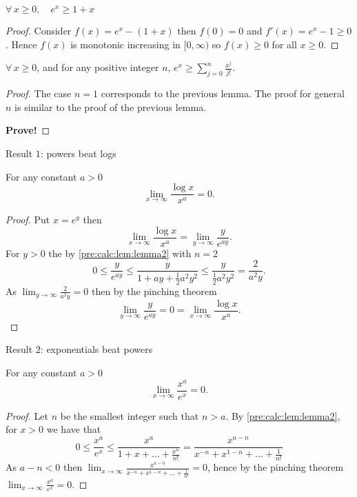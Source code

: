\documentclass[10pt, a4paper]{article}
\begin{document}
\begin{lemma}\label{pre:calc:lem:lemma1}
    $\forall\, x \geq 0,\quad e ^ x \geq 1 + x$
    \begin{proof}
        Consider $f(x) = e ^ x - (1 + x)$ then $f(0) = 0$ and $f'(x) = e ^ x - 1 \geq 0$.
        Hence $f(x)$ is monotonic increasing in $[0, \infty)$ so $f(x) \geq 0$ for all $x \geq 0$.
    \end{proof}
\end{lemma}

\begin{lemma}\label{pre:calc:lem:lemma2}
    $\forall\, x \geq 0$,
    and for any positive integer $n$,
    $e ^ x \geq \sum_{j = 0}^{n}\frac{x ^ j}{j!}$.
    \begin{proof}
    The case $n = 1$ corresponds to the previous lemma.
    The proof for general $n$ is similar to the proof of the previous lemma.
    
    \Large\textbf{Prove!}
    \end{proof}
\end{lemma}

Result $1$: powers beat logs

For any constant $a > 0$
\[
\lim_{x \rightarrow \infty}\frac{\log x}{x ^ a} = 0.
\]
\begin{proof}
    Put $x = e ^ y$ then
    \[
    \lim_{x \rightarrow \infty}\frac{\log x}{x ^ a} = \lim_{y \rightarrow \infty}\frac{y}{e ^ {ay}}.
    \]
    For $y > 0$ the by \autoref{pre:calc:lem:lemma2} with $n = 2$
    \[
    0 \leq \frac{y}{e ^ {ay}} \leq \frac{y}{1 + ay + \frac{1}{2}a ^ 2 y ^ 2} \leq \frac{y}{\frac{1}{2}a ^ 2 y ^ 2} = \frac{2}{a ^ 2 y}.
    \]
    As $\lim_{y \rightarrow \infty}\frac{2}{a ^ 2 y} = 0$ then by the pinching theorem
    \[
    \lim_{y \rightarrow \infty}\frac{y}{e ^ {ay}} = 0 = \lim_{x \rightarrow \infty}\frac{\log x}{x ^ a}.
    \]
\end{proof}

Result $2$: exponentials beat powers

For any constant $a > 0$
\[
\lim_{x \rightarrow \infty}\frac{x ^ a}{e ^ x} = 0.
\]
\begin{proof}
    Let $n$ be the smallest integer such that $n > a$.
    By \autoref{pre:calc:lem:lemma2},
    for $x > 0$ we have that
    \[
    0 \leq \frac{x ^ a}{e ^ x} \leq \frac{x ^ a}{1 + x + \dotsc + \frac{x ^ n}{n!}} = \frac{x ^ {a - n}}{x ^ {-n} + x ^ {1 - n} + \dotsc + \frac{1}{n!}}
    \]
    As $a - n < 0$ then $\lim_{x \rightarrow \infty}\frac{x ^ {a - n}}{x ^ {-n} + x ^ {1 - n} + \dotsc + \frac{1}{n!}} = 0$,
    hence by the pinching theorem $\lim_{x \rightarrow \infty}\frac{x ^ a}{e ^ x} = 0$.
\end{proof}
\end{document}
